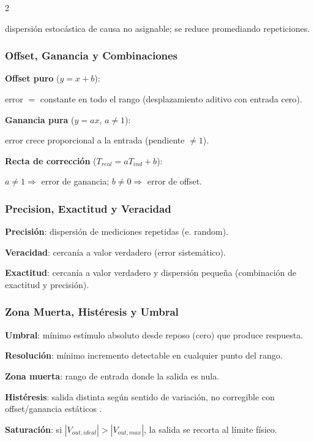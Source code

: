 \documentclass{article}
\begin{document}
\begin{multicols}{2}
\begin{itemform}
dispersión estocástica de causa no asignable; se reduce promediando repeticiones.
\end{itemform}

\subsubsection*{Offset, Ganancia y Combinaciones}
\begin{itemform}
\item \textbf{Offset puro} ($y=x+b$):

error $=$ constante en todo el rango (desplazamiento aditivo con entrada cero).
\item \textbf{Ganancia pura} ($y=ax$, $a\neq1$): 

error crece proporcional a la entrada (pendiente $\neq 1$).

\item \textbf{Recta de corrección} ($T_{real}=aT_{ind}+b$):

$a\neq1 \Rightarrow$ error de ganancia; $b\neq0 \Rightarrow$ error de offset.
\end{itemform}

\subsubsection*{Precision, Exactitud y Veracidad}
\begin{itemform}
\item \textbf{Precisión}: dispersión de mediciones repetidas (e. random).
\item \textbf{Veracidad}: cercanía a valor verdadero (error sistemático).
\item \textbf{Exactitud}: cercanía a valor verdadero y dispersión pequeña (combinación de exactitud y precisión).

\end{itemform}

\subsubsection*{Zona Muerta, Histéresis y Umbral}
\begin{itemform}
\item \textbf{Umbral}: mínimo estímulo absoluto desde reposo (cero) que produce respuesta.
\item \textbf{Resolución}: mínimo incremento detectable en cualquier punto del rango.
\item \textbf{Zona muerta}: rango de entrada donde la salida es nula.
\item \textbf{Histéresis}: salida distinta según sentido de variación, no corregible con offset/ganancia estáticos .
\item \textbf{Saturación}: si $|V_{out,ideal}|>|V_{out,max}|$, la salida se recorta al límite físico.
\end{itemform}





\end{multicols}
\end{document}
